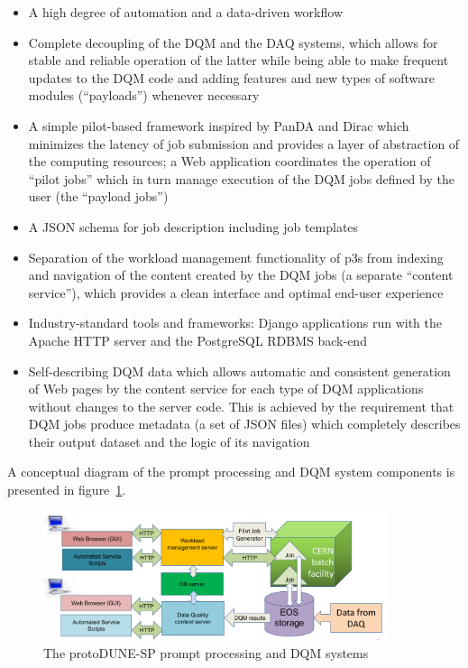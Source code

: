 \documentclass{webofc}
\begin{document}
\begin{itemize}

\item A high degree of automation and a data-driven workflow

\item Complete decoupling of the DQM and the DAQ systems, which allows
for stable and reliable operation of the latter while being able to make frequent updates to the
DQM code and adding features and new types of software modules (``payloads'') whenever
necessary

\item A simple pilot-based framework inspired by PanDA and Dirac \cite{panda,dirac}
which minimizes the latency of job submission and provides a layer of abstraction
of the computing resources; a Web application coordinates the operation of ``pilot jobs''
which in turn manage execution of the DQM jobs defined by the user (the ``payload jobs'')

\item A JSON schema for job description including job templates

\item Separation of the workload management functionality  of p3s  from
indexing and navigation of the content created by the DQM  jobs (a separate ``content service''),
which provides a clean interface and optimal end-user experience

\item Industry-standard tools and frameworks: Django\cite{django} applications
run with the Apache HTTP server and the PostgreSQL RDBMS back-end

\item Self-describing DQM data which allows automatic and consistent generation of Web pages
by the content service for each type of DQM applications without changes to the server code.
This is achieved by the requirement that DQM jobs produce metadata (a set of JSON files)
which completely describes their output dataset and the logic of its navigation

\end{itemize}
\noindent
A conceptual diagram of the prompt processing and DQM system components
is presented in figure~\ref{fig:dqm-diagram}.

\begin{figure}[h]
\centering
\includegraphics[width=0.9\textwidth,clip]{figures/dqm-p3s-diagram.png}
\caption{The protoDUNE-SP prompt processing and DQM systems}
\label{fig:dqm-diagram}
\end{figure}
\end{document}
